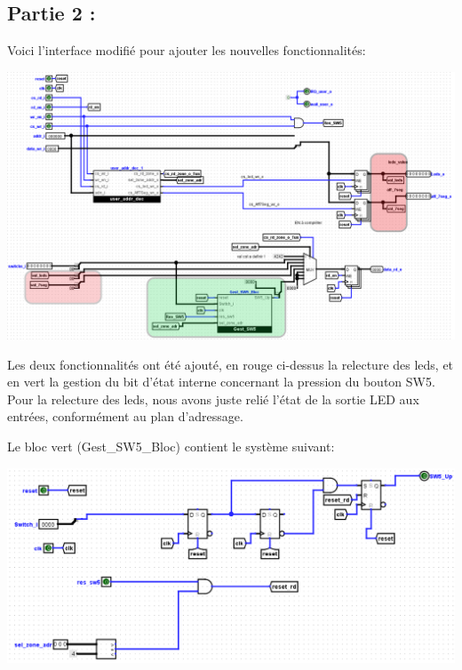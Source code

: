\subsection*{Partie 2 :}
\par
Voici l'interface modifié pour ajouter les nouvelles fonctionnalités:\\
\begin{center}
\includegraphics[scale=0.5]{./images/Full_partie2.png}\\\par
{}
\end{center}\par
Les deux fonctionnalités ont été ajouté, en rouge ci-dessus la relecture des leds, et en vert la gestion du bit d'état interne concernant la pression du bouton SW5. Pour la relecture des leds, nous avons juste relié l'état de la sortie LED aux entrées, conformément au plan d'adressage.\\
\par
Le bloc vert (Gest\_SW5\_Bloc) contient le système suivant:\\
\begin{center}
\includegraphics[scale=0.6]{./images/gestSW5_partie2.png}\\\par
{}
\end{center}
